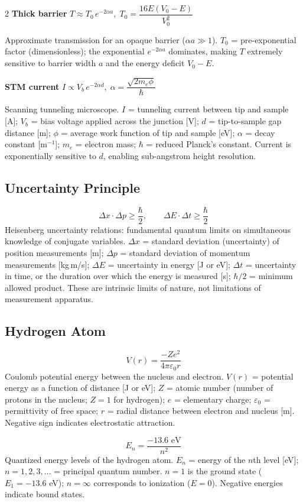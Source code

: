 \documentclass[9pt]{extarticle}
\newcommand{\eqlabel}[1]{\textbf{\scriptsize #1}\;}
\newcommand{\desc}[1]{{\small\color{desc}#1}}
\begin{document}
\begin{multicols}{2}
\eqlabel{Thick barrier} $T \approx T_0\,e^{-2\alpha a},\; T_0 = \dfrac{16E(V_0-E)}{V_0^2}$

\desc{Approximate transmission for an opaque barrier ($\alpha a \gg 1$). $T_0$ = pre-exponential factor (dimensionless); the exponential $e^{-2\alpha a}$ dominates, making $T$ extremely sensitive to barrier width $a$ and the energy deficit $V_0 - E$.}

\eqlabel{STM current} $I \propto V_b\,e^{-2\alpha d},\; \alpha = \dfrac{\sqrt{2m_e\phi}}{\hbar}$

\desc{Scanning tunneling microscope. $I$ = tunneling current between tip and sample [A]; $V_b$ = bias voltage applied across the junction [V]; $d$ = tip-to-sample gap distance [m]; $\phi$ = average work function of tip and sample [eV]; $\alpha$ = decay constant [m$^{-1}$]; $m_e$ = electron mass; $\hbar$ = reduced Planck's constant. Current is exponentially sensitive to $d$, enabling sub-angstrom height resolution.}

\subsection{Uncertainty Principle}
\[\Delta x\cdot\Delta p \geq \frac{\hbar}{2},\qquad \Delta E\cdot\Delta t \geq \frac{\hbar}{2}\]
\desc{Heisenberg uncertainty relations: fundamental quantum limits on simultaneous knowledge of conjugate variables. $\Delta x$ = standard deviation (uncertainty) of position measurements [m]; $\Delta p$ = standard deviation of momentum measurements [kg\,m/s]; $\Delta E$ = uncertainty in energy [J or eV]; $\Delta t$ = uncertainty in time, or the duration over which the energy is measured [s]; $\hbar/2$ = minimum allowed product. These are intrinsic limits of nature, not limitations of measurement apparatus.}

\subsection{Hydrogen Atom}
\[V(r) = \frac{-Ze^2}{4\pi\varepsilon_0 r}\]
\desc{Coulomb potential energy between the nucleus and electron. $V(r)$ = potential energy as a function of distance [J or eV]; $Z$ = atomic number (number of protons in the nucleus; $Z = 1$ for hydrogen); $e$ = elementary charge; $\varepsilon_0$ = permittivity of free space; $r$ = radial distance between electron and nucleus [m]. Negative sign indicates electrostatic attraction.}

\[E_n = \frac{-13.6\text{ eV}}{n^2}\]
\desc{Quantized energy levels of the hydrogen atom. $E_n$ = energy of the $n$th level [eV]; $n = 1, 2, 3, \ldots$ = principal quantum number. $n = 1$ is the ground state ($E_1 = -13.6$ eV); $n = \infty$ corresponds to ionization ($E = 0$). Negative energies indicate bound states.}


\end{multicols}
\end{document}
